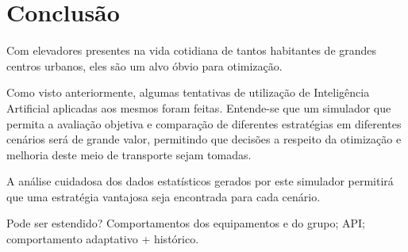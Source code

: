 \chapter{\label{chap:conclusion}Conclusão}

Com elevadores presentes na vida cotidiana de tantos habitantes de grandes
centros urbanos, eles são um alvo óbvio para otimização.

Como visto anteriormente, algumas tentativas de utilização de Inteligência
Artificial aplicadas aos mesmos foram feitas. Entende-se que um simulador que
permita a avaliação objetiva e comparação de diferentes estratégias em
diferentes cenários será de grande valor, permitindo que decisões a respeito da
otimização e melhoria deste meio de transporte sejam tomadas.

A análise cuidadosa dos dados estatísticos gerados por este simulador permitirá
que uma estratégia vantajosa seja encontrada para cada cenário.

{\color{red}Pode ser estendido? Comportamentos dos equipamentos e do grupo; API; comportamento adaptativo + histórico.}